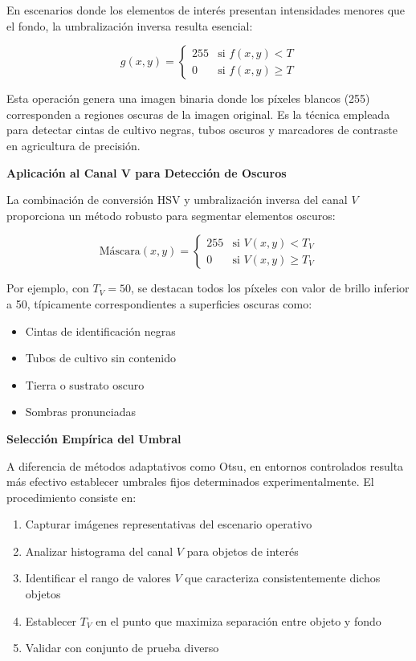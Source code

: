 En escenarios donde los elementos de interés presentan intensidades menores que el fondo, la umbralización inversa resulta esencial:

\begin{equation}
g(x,y) = \begin{cases}
255 & \text{si } f(x,y) < T \\
0 & \text{si } f(x,y) \geq T
\end{cases}
\end{equation}

Esta operación genera una imagen binaria donde los píxeles blancos (255) corresponden a regiones oscuras de la imagen original. Es la técnica empleada para detectar cintas de cultivo negras, tubos oscuros y marcadores de contraste en agricultura de precisión.

\textbf{Aplicación al Canal V para Detección de Oscuros}

La combinación de conversión HSV y umbralización inversa del canal $V$ proporciona un método robusto para segmentar elementos oscuros:

\begin{equation}
\text{Máscara}(x,y) = \begin{cases}
255 & \text{si } V(x,y) < T_V \\
0 & \text{si } V(x,y) \geq T_V
\end{cases}
\end{equation}

Por ejemplo, con $T_V = 50$, se destacan todos los píxeles con valor de brillo inferior a 50, típicamente correspondientes a superficies oscuras como:
\begin{itemize}
\item Cintas de identificación negras
\item Tubos de cultivo sin contenido
\item Tierra o sustrato oscuro
\item Sombras pronunciadas
\end{itemize}

\textbf{Selección Empírica del Umbral}

A diferencia de métodos adaptativos como Otsu, en entornos controlados resulta más efectivo establecer umbrales fijos determinados experimentalmente. El procedimiento consiste en:

\begin{enumerate}
\item Capturar imágenes representativas del escenario operativo
\item Analizar histograma del canal $V$ para objetos de interés
\item Identificar el rango de valores $V$ que caracteriza consistentemente dichos objetos
\item Establecer $T_V$ en el punto que maximiza separación entre objeto y fondo
\item Validar con conjunto de prueba diverso
\end{enumerate}

